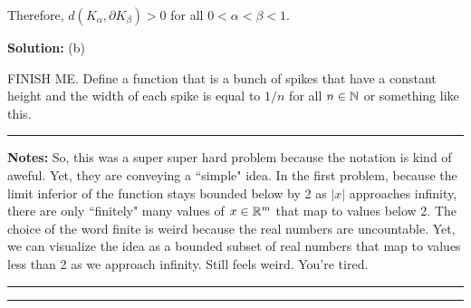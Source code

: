 \documentclass{article}
\begin{document}
Therefore, $d(K_\alpha,\partial K_\beta) > 0$ for all $0 < \alpha < \beta < 1$. 


\textbf{Solution:} (b)

FINISH ME. Define a function that is a bunch of spikes that have a constant height and the width of each spike is equal to $1/n$ for all $n\in \mathbb N$ or something like this.\\

\hrule

\textbf{Notes:} So, this was a super super hard problem because the notation is kind of aweful. Yet, they are conveying a ``simple" idea. In the first problem, because the limit inferior of the function stays bounded below by 2 as $|x|$ approaches infinity, there are only ``finitely" many values of $x\in \mathbb R^m$ that map to values below 2. The choice of the word finite is weird because the real numbers are uncountable. Yet, we can visualize the idea as a bounded subset of real numbers that map to values less than 2 as we approach infinity. Still feels weird. You're tired.\\

\hrule \vspace{2pts}
\hrule

\break
\end{document}
